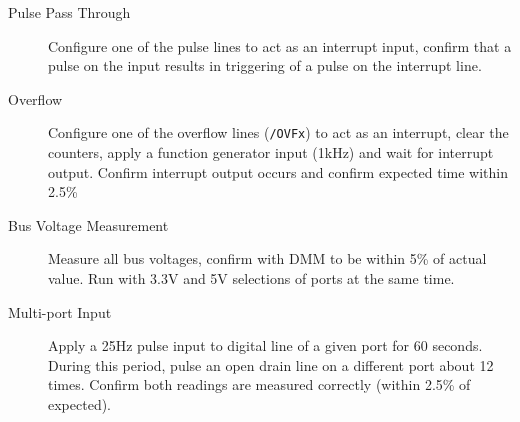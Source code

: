 \begin{description}
\item [Pulse Pass Through] Configure one of the pulse lines to act as an interrupt input, confirm that a pulse on the input results in triggering of a pulse on the interrupt line. 
\item [Overflow] Configure one of the overflow lines (\texttt{/OVFx}) to act as an interrupt, clear the counters, apply a function generator input (1kHz) and wait for interrupt output. Confirm interrupt output occurs and confirm expected time within 2.5\%
\item [Bus Voltage Measurement] Measure all bus voltages, confirm with DMM to be within 5\% of actual value. Run with 3.3V and 5V selections of ports at the same time. 
\item [Multi-port Input] Apply a 25Hz pulse input to digital line of a given port for 60 seconds. During this period, pulse an open drain line on a different port about 12 times. Confirm both readings are measured correctly (within 2.5\% of expected).

\end{description}
